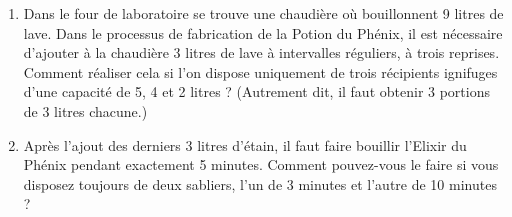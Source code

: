 \documentclass{article}
\begin{document}
\begin{enumerate}
	\item
		Dans le four de laboratoire se trouve une chaudière où bouillonnent 9
		litres de lave. Dans le processus de fabrication de la Potion du
		Phénix, il est nécessaire d'ajouter à la chaudière 3 litres de lave à
		intervalles réguliers, à trois reprises. Comment réaliser cela si l'on
		dispose uniquement de trois récipients ignifuges d'une capacité de 5, 4
		et 2 litres ? (Autrement dit, il faut obtenir 3 portions de 3 litres
		chacune.)
	\item 
		Après l'ajout des derniers 3 litres d'étain, il faut faire bouillir
		l'Elixir du Phénix pendant exactement 5 minutes. Comment pouvez-vous le
		faire si vous disposez toujours de deux sabliers, l'un de 3 minutes et
		l'autre de 10 minutes ?
\end{enumerate}
\end{document}
